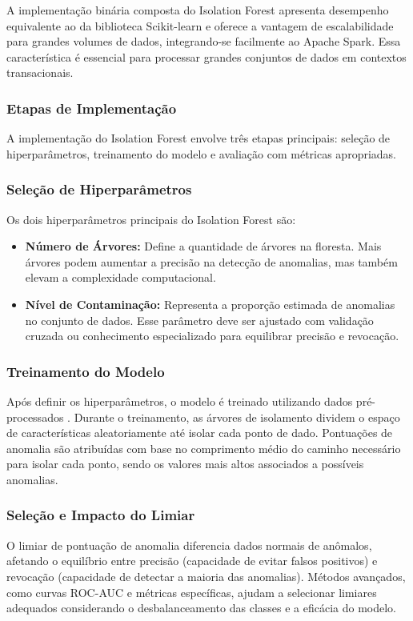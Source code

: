 \documentclass[12pt,a4paper]{article}
\begin{document}
A implementação binária composta do Isolation Forest apresenta desempenho equivalente ao da biblioteca Scikit-learn e oferece a vantagem de escalabilidade para grandes volumes de dados, integrando-se facilmente ao Apache Spark. Essa característica é essencial para processar grandes conjuntos de dados em contextos transacionais.

\subsubsection{Etapas de Implementação}
A implementação do Isolation Forest envolve três etapas principais: seleção de hiperparâmetros, treinamento do modelo e avaliação com métricas apropriadas.

\subsubsection{Seleção de Hiperparâmetros}
Os dois hiperparâmetros principais do Isolation Forest são:
\begin{itemize}
    \item \textbf{Número de Árvores:} Define a quantidade de árvores na floresta. Mais árvores podem aumentar a precisão na detecção de anomalias, mas também elevam a complexidade computacional.
    \item \textbf{Nível de Contaminação:} Representa a proporção estimada de anomalias no conjunto de dados. Esse parâmetro deve ser ajustado com validação cruzada ou conhecimento especializado para equilibrar precisão e revocação.
\end{itemize}

\subsubsection{Treinamento do Modelo}
Após definir os hiperparâmetros, o modelo é treinado utilizando dados pré-processados \cite{meduri2024}. Durante o treinamento, as árvores de isolamento dividem o espaço de características aleatoriamente até isolar cada ponto de dado. Pontuações de anomalia são atribuídas com base no comprimento médio do caminho necessário para isolar cada ponto, sendo os valores mais altos associados a possíveis anomalias.

\subsubsection{Seleção e Impacto do Limiar}
O limiar de pontuação de anomalia diferencia dados normais de anômalos, afetando o equilíbrio entre precisão (capacidade de evitar falsos positivos) e revocação (capacidade de detectar a maioria das anomalias). Métodos avançados, como curvas ROC-AUC e métricas específicas, ajudam a selecionar limiares adequados considerando o desbalanceamento das classes e a eficácia do modelo.
\end{document}
